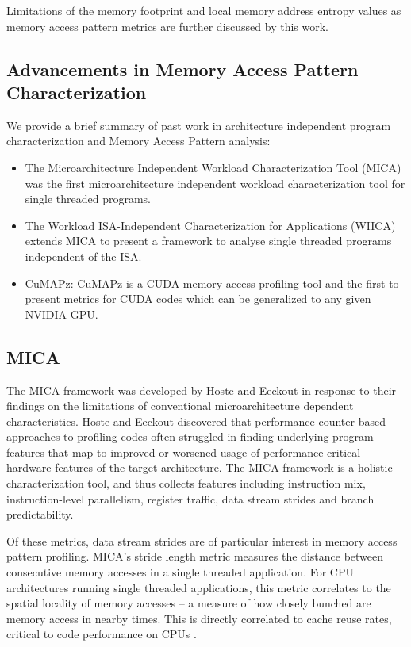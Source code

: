 \documentclass[review=false, sigchi]{acmart}
\begin{document}
	Limitations of the memory footprint and local memory address entropy values as memory access pattern metrics are further discussed by this work. %
	
	\subsection{Advancements in Memory Access Pattern Characterization}
	
	We provide a brief summary of past work in architecture independent program characterization and Memory Access Pattern analysis:
	
	\begin{itemize}
		\item The Microarchitecture Independent Workload Characterization Tool (MICA) \cite{hoste2007microarchitecture} was the first microarchitecture independent workload characterization tool for single threaded programs. 
		\item The Workload ISA-Independent Characterization for Applications (WIICA) \cite{shao2013isa} extends MICA to present a framework to analyse single threaded programs independent of the ISA.
		\item CuMAPz: CuMAPz \cite{kim2011cumapz} is a CUDA memory access profiling tool and the first to present metrics for CUDA codes which can be generalized to any given NVIDIA GPU.
	\end{itemize}
	
	\subsection{MICA}
	
	The MICA framework was developed by Hoste and Eeckout \cite{hoste2007microarchitecture} in response to their findings on the limitations of conventional microarchitecture dependent characteristics. Hoste and Eeckout discovered that performance counter based approaches to profiling codes often struggled in finding underlying program features that map to improved or worsened usage of performance critical hardware features of the target architecture. The MICA framework is a holistic characterization tool, and thus collects features including instruction mix, instruction-level parallelism, register traffic, data stream strides and branch predictability.
	
	Of these metrics, data stream strides are of particular interest in memory access pattern profiling. MICA's stride length metric measures the distance between consecutive memory accesses in a single threaded application. For CPU architectures running single threaded applications, this metric correlates to the spatial locality of memory accesses -- a measure of how closely bunched are memory access in nearby times. This is directly correlated to cache reuse rates, critical to code performance on CPUs \cite{inteloptimisation}. %
	
\end{document}
